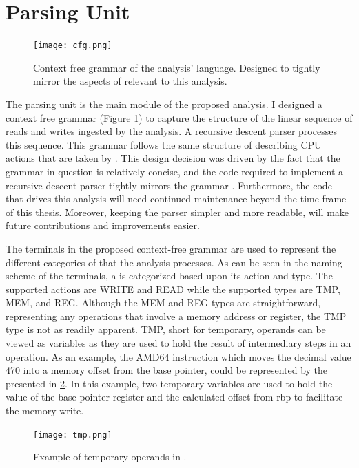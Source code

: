 \section{Parsing Unit}

\begin{figure}[hb]
    \centering
    \texttt{[image: cfg.png]}
    \caption[Context Free Grammar of the Analysis' Language]{Context free grammar of the analysis' language. Designed to tightly mirror the aspects of  relevant to this analysis.}
    \label{fig:cfg}
\end{figure}

The parsing unit is the main module of the proposed analysis. 
I designed a context free grammar (Figure \ref{fig:cfg}) to capture the structure of the linear sequence of reads and writes ingested by the analysis. A recursive descent parser processes this sequence. This grammar follows the same structure of describing CPU actions that are taken by . This design decision was driven by the fact that the grammar in question is relatively concise, and the code required to implement a recursive descent parser tightly mirrors the grammar \citep{redziejowski2007parsing}. Furthermore, the code that drives this analysis will need continued maintenance beyond the time frame of this thesis. Moreover, keeping the parser simpler and more readable, will make future contributions and improvements easier.

The terminals in the proposed context-free grammar  are used to represent the different categories of  that the analysis processes. As can be seen in the naming scheme of the terminals, a  is categorized based upon its action and type. The supported actions are WRITE and READ while the supported types are TMP, MEM, and REG. Although the MEM and REG types are straightforward, representing any operations that involve a memory address or register, the TMP type is not as readily apparent. TMP, short for temporary, operands can be viewed as variables as they are used to hold the result of intermediary steps in an operation. As an example, the AMD64 instruction  which moves the decimal value 470 into a memory offset from the base pointer, could be represented by the  presented in \ref{fig:tmp}. In this example, two temporary variables are used to hold the value of the base pointer register and the calculated offset from rbp to facilitate the memory write. 

\begin{figure}
    \centering
    \texttt{[image: tmp.png]}
    \caption[Example of Temporary Operands in Angr]{Example of temporary operands in .}
    \label{fig:tmp}
\end{figure}

